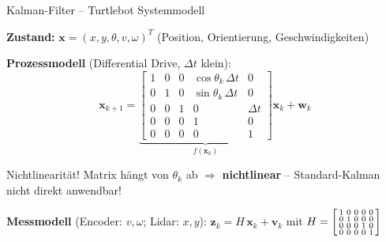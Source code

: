 \documentclass[%
  aspectratio=169,
  10pt
]{beamer}
\newcommand{\warn}[1]{{\color{blackberry}\textbf{#1}}}
\begin{document}
\begin{frame}{Kalman-Filter -- Turtlebot Systemmodell}

\textbf{Zustand:} $\mathbf{x} = (x, y, \theta, v, \omega)^T$
\quad (Position, Orientierung, Geschwindigkeiten)

\vspace{2mm}
\textbf{Prozessmodell} (Differential Drive, $\Delta t$ klein):
\[
  \mathbf{x}_{k+1} = \underbrace{
    \begin{bmatrix}
      1 & 0 & 0 & \cos\theta_k\,\Delta t & 0 \\
      0 & 1 & 0 & \sin\theta_k\,\Delta t & 0 \\
      0 & 0 & 1 & 0 & \Delta t \\
      0 & 0 & 0 & 1 & 0 \\
      0 & 0 & 0 & 0 & 1
    \end{bmatrix}
  }_{f(\mathbf{x}_k)} \mathbf{x}_k + \mathbf{w}_k
\]

\pause
\begin{alertblock}{Nichtlinearität!}
  \vspace{-2mm}Matrix hängt von $\theta_k$ ab $\Rightarrow$ \warn{nichtlinear} -- Standard-Kalman nicht direkt anwendbar!\vspace{-2mm}
\end{alertblock}

\vspace{0.5mm}
\textbf{Messmodell} (Encoder: $v, \omega$; Lidar: $x,y$):\;
$\mathbf{z}_k = H\,\mathbf{x}_k + \mathbf{v}_k$\; mit\;
$H = \begin{bsmallmatrix} 1&0&0&0&0 \\ 0&1&0&0&0 \\ 0&0&0&1&0 \\ 0&0&0&0&1 \end{bsmallmatrix}$

\end{frame}
\end{document}
